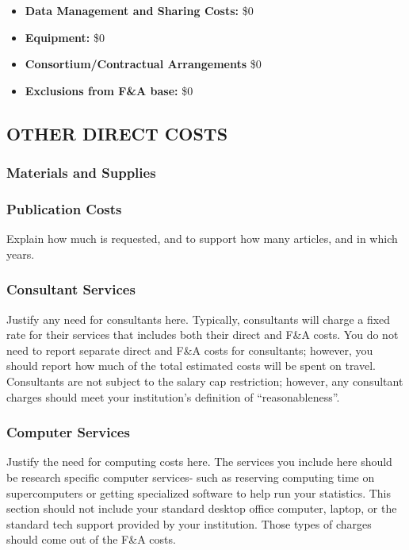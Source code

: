 \documentclass[../main.tex]{subfiles}
\begin{document}
\begin{itemize}
    \item \textbf{Data Management and Sharing Costs:} \$0
       \item \textbf{Equipment:} \$0
       \item \textbf{Consortium/Contractual Arrangements} \$0
       \item \textbf{Exclusions from F\&A base:} \$0 
   \end{itemize}



\subsection{OTHER DIRECT COSTS}
\subsubsection{Materials and Supplies}

\subsubsection{Publication Costs}
Explain how much is requested, and to support how many articles, and in which years.


\subsubsection{Consultant Services} 
Justify any need for consultants here. 
Typically, consultants will charge a fixed rate for their services that includes both their direct and F\&A costs. 
You do not need to report separate direct and F\&A costs for consultants; however, you should report how much of the total estimated costs will be spent on travel. 
Consultants are not subject to the salary cap restriction; however, any consultant charges should meet your institution's definition of ``reasonableness''.


\subsubsection{Computer Services}
Justify the need for computing costs here. The services you include here should be research specific computer services- such as reserving computing time on supercomputers or getting specialized software to help run your statistics. This section should not include your standard desktop office computer, laptop, or the standard tech support provided by your institution. Those types of charges should come out of the F\&A costs.
\end{document}
